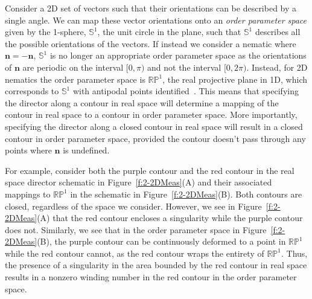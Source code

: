 Consider a 2D set of vectors such that their orientations can be described by a single angle.
We can map these vector orientations onto an \emph{order parameter space} given by the 1-sphere, $\mathbb{S}^1$, the unit circle in the plane, such that $\mathbb{S}^1$ describes all the possible orientations of the vectors.
If instead we consider a nematic where $\mathbf{n} = -\mathbf{n}$, $\mathbb{S}^1$ is no longer an appropriate order parameter space as the orientations of $\mathbf{n}$ are periodic on the interval $[0,\pi)$ and not the interval $[0,2 \pi)$.
Instead, for 2D nematics the order parameter space is $\mathbb{R}\mathbb{P}^1$, the real projective plane in 1D, which corresponds to $\mathbb{S}^1$ with antipodal points identified~\cite{RN196,RN153,RN236}.
This means that specifying the director along a contour in real space will determine a mapping of the contour in real space to a contour in order parameter space.
More importantly, specifying the director along a closed contour in real space will result in a closed contour in order parameter space, provided the contour doesn't pass through any points where $\mathbf{n}$ is undefined.

For example, consider both the purple contour and the red contour in the real space director schematic in Figure~\ref{f:2-2DMeas}(A) and their associated mappings to $\mathbb{R}\mathbb{P}^1$ in the schematic in Figure~\ref{f:2-2DMeas}(B).
Both contours are closed, regardless of the space we consider.
However, we see in Figure~\ref{f:2-2DMeas}(A) that the red contour encloses a singularity while the purple contour does not.
Similarly, we see that in the order parameter space in Figure~\ref{f:2-2DMeas}(B), the purple contour can be continuously deformed to a point in $\mathbb{R}\mathbb{P}^1$ while the red contour cannot, as the red contour wraps the entirety of $\mathbb{R}\mathbb{P}^1$.
Thus, the presence of a singularity in the area bounded by the red contour in real space results in a nonzero winding number in the red contour in the order parameter space.

